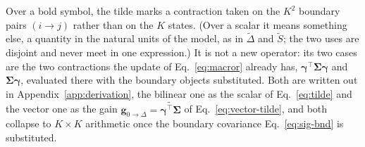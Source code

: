 \begin{appendixbox}
Over a bold symbol, the tilde marks a contraction taken on the $K^2$ boundary pairs $(i\to j)$
rather than on the $K$ states. (Over a scalar it means something else, a quantity in the natural
units of the model, as in $\widetilde{\Delta}$ and $\widetilde{S}$; the two uses are disjoint and
never meet in one expression.) It is not a new operator: its two cases are the two contractions the update of
Eq.~\ref{eq:macror} already has, $\boldsymbol{\gamma}^\top\boldsymbol{\Sigma}\boldsymbol{\gamma}$ and
$\boldsymbol{\Sigma}\boldsymbol{\gamma}$, evaluated there with the boundary objects substituted. Both are written out in Appendix~\ref{app:derivation}, the
bilinear one as the scalar of Eq.~\ref{eq:tilde} and the vector one as the gain
$\mathbf{g}_{0\to\Delta}=\widetilde{\boldsymbol{\gamma}^\top\boldsymbol{\Sigma}}$ of Eq.~\ref{eq:vector-tilde}, and both
collapse to $K\times K$ arithmetic once the boundary covariance Eq.~\ref{eq:sig-bnd} is
substituted.


\end{appendixbox}
